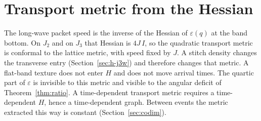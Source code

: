 \section{Transport metric from the Hessian}
\label{sec:h-metric}

The long-wave packet speed is the inverse of the Hessian of \(\varepsilon(q)\)
at the band bottom.
On \(J_2\) and on \(J_3\) that Hessian is \(4J\, I\), so the quadratic transport
metric is conformal to the lattice metric, with speed fixed by \(J\).
A stitch density changes the transverse entry
(Section~\ref{sec:h-j3w}) and therefore changes that metric.
A flat-band texture does not enter \(H\) and does not move arrival times.
The quartic part of \(\varepsilon\) is invisible to this metric and visible to
the angular deficit of Theorem~\ref{thm:ratio}.
A time-dependent transport metric requires a time-dependent \(H\), hence a
time-dependent graph.
Between events the metric extracted this way is constant
(Section~\ref{sec:codim}).
